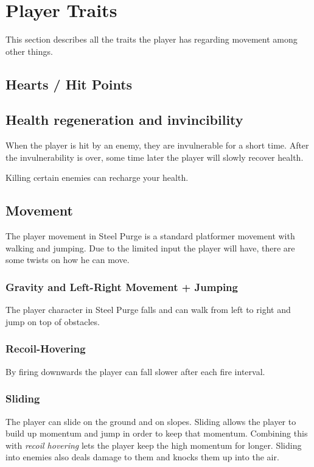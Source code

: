 \documentclass[../Main.tex]{subfiles}
\begin{document}
\section{Player Traits}

This section describes all the traits the player has regarding movement among other things.

\subsection{Hearts / Hit Points}


\subsection{Health regeneration and invincibility}

When the player is hit by an enemy, they are invulnerable for a short time. After the invulnerability is over, some time later the player will slowly recover health.

Killing certain enemies can recharge your health. 

\subsection{Movement}

The player movement in Steel Purge is a standard platformer movement with walking and jumping. Due to the limited input the player will have, there are some twists on how he can move.

\subsubsection{Gravity and Left-Right Movement + Jumping}

The player character in Steel Purge falls and can walk from left to right and jump on top of obstacles.

\subsubsection{Recoil-Hovering}

By firing downwards the player can fall slower after each fire interval.

\subsubsection{Sliding}

The player can slide on the ground and on slopes. Sliding allows the player to build up momentum and jump in order to keep that momentum. Combining this with \emph{recoil hovering} lets the player keep the high momentum for longer. Sliding into enemies also deals damage to them and knocks them up into the air. 
\end{document}
